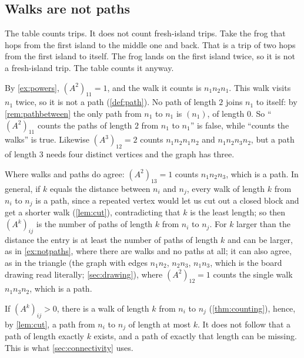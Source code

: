\subsection{Walks are not paths}

\plainwords{} The table counts trips. It does not count fresh-island trips.
Take the frog that hops from the first island to the middle one and back.
That is a trip of two hops from the first island to itself. The frog lands
on the first island twice, so it is not a fresh-island trip. The table
counts it anyway.

\begin{example}\label{ex:notpaths}
By \cref{ex:powers}, $(A^2)_{11}=1$, and the walk it counts is
$n_1n_2n_1$. This walk visits $n_1$ twice, so it is not a path
(\cref{def:path}). No path of length $2$ joins $n_1$ to itself: by
\cref{rem:pathbetween} the only path from $n_1$ to $n_1$ is
$(n_1)$, of length $0$. So ``$(A^2)_{11}$ counts the paths of length $2$
from $n_1$ to $n_1$'' is false, while ``counts the walks'' is true.
Likewise $(A^3)_{12}=2$ counts $n_1n_2n_1n_2$ and $n_1n_2n_3n_2$, but a
path of length $3$ needs four distinct vertices and the graph has three.
\end{example}

Where walks and paths do agree: $(A^2)_{13}=1$ counts $n_1n_2n_3$, which is
a path. In general, if $k$ equals the distance between $n_i$ and $n_j$,
every walk of length $k$ from $n_i$ to $n_j$ is a path, since a repeated
vertex would let us cut out a closed block and get a shorter walk
(\cref{lem:cut}), contradicting that $k$ is the least length; so then
$(A^k)_{ij}$ is the number of paths of length $k$ from $n_i$ to $n_j$. For
$k$ larger than the distance the entry is at least the number of paths of
length $k$ and can be larger, as in \cref{ex:notpaths}, where there are
walks and no paths at all; it can also agree, as in the triangle (the graph with edges $n_1n_2$, $n_2n_3$, $n_1n_3$, which
is the board drawing read literally; \cref{sec:drawing}), where
$(A^2)_{12}=1$ counts the single walk $n_1n_3n_2$, which is a path.

\begin{remark}\label{rem:positive}
If $(A^k)_{ij}>0$, there is a walk of length $k$ from $n_i$ to $n_j$
(\cref{thm:counting}), hence, by \cref{lem:cut}, a path from $n_i$ to $n_j$
of length at most $k$. It does not follow that a path of length exactly $k$
exists, and a path of exactly that length can be missing. This is what
\cref{sec:connectivity} uses.
\end{remark}

